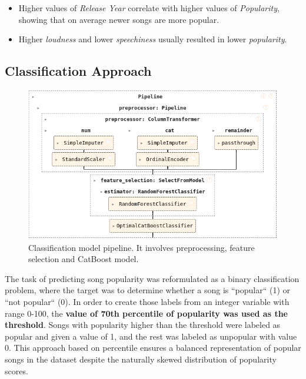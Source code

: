 \begin{itemize}
  \item Higher values of \textit{Release Year} correlate with higher values of
    \textit{Popularity}, showing that on average newer songs are more
    popular.
  \item Higher \textit{loudness} and lower \textit{speechiness}
    usually resulted in lower \textit{popularity}.
\end{itemize}



\subsection{Classification Approach}

\begin{center}
\begin{figure}[H]
  \centering
  \includegraphics[width=6in]{img/clf_pipeline.png}
  \caption{Classification model pipeline. It involves preprocessing, feature
  selection and CatBoost model.}
  \label{Figure:fig_beh}
\end{figure}
\end{center}

The task of predicting song popularity was reformulated as a binary
classification problem, where the target was to determine whether a song is
``popular`` (1) or ``not popular`` (0). In order to create those labels from an
integer variable with range 0-100, the \textbf{value of 70th percentile of
popularity was used as the threshold}. Songs with popularity higher than the
threshold were labeled as popular and given a value of 1, and the rest was
labeled as unpopular with value 0. This approach based on percentile ensures a
balanced representation of popular songs in the dataset despite the naturally
skewed distribution of popularity scores.

